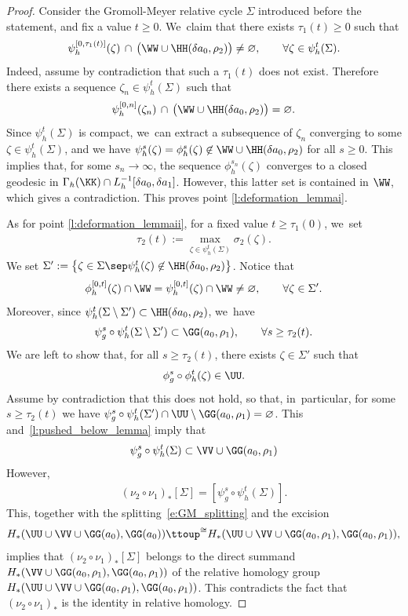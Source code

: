 \begin{proof}
Consider the Gromoll-Meyer relative cycle $\Sigma$ introduced before the statement, and fix a value $t\geq0$. We~claim that there exists $\tau_1(t)\geq0$ such that
\[
\psi_h^{[0,\tau_1(t)]}(\zeta)\, \cap\, \big(\WW\cup\HH(\delta a_0,\rho_2)\big)\neq\varnothing,
\qquad
\forall \zeta\in\psi_h^t(\Sigma).
\]
Indeed, assume by contradiction that such a $\tau_1(t)$ does not exist. Therefore there exists a sequence $\zeta_n\in\psi_h^t(\Sigma)$ such that
\[
\psi_h^{[0,n]}(\zeta_n)\, \cap\, \big(\WW\cup\HH(\delta a_0,\rho_2)\big)=\varnothing.
\]
Since $\psi_h^t(\Sigma)$ is compact, we~can extract a subsequence of $\zeta_n$ converging to some $\zeta\in\psi_h^t(\Sigma)$, and we have $\psi_h^s(\zeta)=\phi_h^s(\zeta)\not\in\WW\cup\HH(\delta a_0,\rho_2)$ for all $s\geq0$. This implies that, for some $s_n\to\infty$, the sequence $\phi_h^{s_n}(\zeta)$ converges to a closed geodesic in $\Gamma_h(\KK)\cap L_h^{-1}[\delta a_0,\delta a_1]$. However, this latter set is contained in $\WW$, which gives a contradiction. This proves point \eqref{l:deformation_lemmai}.

As for point \eqref{l:deformation_lemmaii}, for a fixed value $t\geq\tau_1(0)$, we~set
\begin{align*}
\tau_2(t):=\max_{\zeta\in\psi_h^t(\Sigma)} \sigma_2(\zeta).
\end{align*}
We set
$\Sigma':=\big\{\zeta\in\Sigma\sep \psi_h^t(\zeta)\not\in \HH(\delta a_0,\rho_2) \big\}$.
Notice that
\[
\phi_h^{[0,t]}(\zeta)\cap \WW
=\psi_h^{[0,t]}(\zeta)\cap \WW\neq\varnothing,
\qquad\forall\zeta\in\Sigma'.
\]
Moreover, since $\psi_h^{t}(\Sigma\setminus\Sigma') \subset \HH(\delta a_0,\rho_2)$, we~have
\begin{align}
\label{l:pushed_below_lemma}
\psi_g^{s}\circ \psi_h^{t}(\Sigma\setminus\Sigma')\subset\GG(a_0,\rho_1),\qquad\forall s\geq\tau_2(t).
\end{align}
We are left to show that, for all $s\geq\tau_2(t)$, there exists $\zeta\in\Sigma'$ such that \[
\phi_g^s\circ\phi_h^t(\zeta)\in\UU.
\]
Assume by contradiction that this does not hold, so that, in~particular, for some $s\geq\tau_2(t)$ we have
$\psi_g^s\circ\psi_h^t(\Sigma')\cap\UU\setminus\GG(a_0,\rho_1)=\varnothing$. This and~\eqref{l:pushed_below_lemma} imply that
\begin{align*}
\psi_g^s\circ\psi_h^t(\Sigma)
\subset
\VV\cup\GG(a_0,\rho_1)
\end{align*}
However,
\begin{align*}
(\nu_2\circ\nu_1)_*[\Sigma]=[\psi_g^s\circ\psi_h^t(\Sigma)].
\end{align*}
This, together with the splitting~\eqref{e:GM_splitting} and the excision
\[
H_*(\UU\cup\VV\cup\GG(a_0) , \GG(a_0))
\ttoup^{\cong}
H_*(\UU\cup\VV\cup\GG(a_0,\rho_1) , \GG(a_0,\rho_1)),
\]
implies that $(\nu_2\circ\nu_1)_*[\Sigma]$ belongs to the direct summand $H_*(\VV\cup\GG(a_0,\rho_1) , \GG(a_0,\rho_1))$ of the relative homology group $H_*(\UU\cup\VV\cup\GG(a_0,\rho_1) , \GG(a_0,\rho_1))$. This contradicts the fact that $(\nu_2\circ\nu_1)_*$ is the identity in relative homology.
\end{proof}


